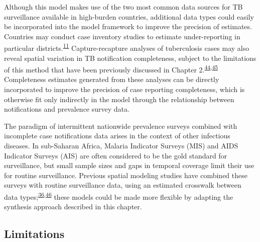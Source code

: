 \documentclass[
]{article}
\begin{document}
Although this model makes use of the two most common data sources for TB surveillance available in high-burden countries, additional data types could easily be incorporated into the model framework to improve the precision of estimates. Countries may conduct case inventory studies to estimate under-reporting in particular districts.\textsuperscript{\protect\hyperlink{ref-Glaziou2018a}{11}} Capture-recapture analyses of tuberculosis cases may also reveal spatial variation in TB notification completeness, subject to the limitations of this method that have been previously discussed in Chapter 2.\textsuperscript{\protect\hyperlink{ref-Hook1995}{44},\protect\hyperlink{ref-VanHest2011}{45}} Completeness estimates generated from these analyses can be directly incorporated to improve the precision of case reporting completeness, which is otherwise fit only indirectly in the model through the relationship between notifications and prevalence survey data.

The paradigm of intermittent nationwide prevalence surveys combined with incomplete case notifications data arises in the context of other infectious diseases. In sub-Saharan Africa, Malaria Indicator Surveys (MIS) and AIDS Indicator Surveys (AIS) are often considered to be the gold standard for surveillance, but small sample sizes and gaps in temporal coverage limit their use for routine surveillance. Previous spatial modeling studies have combined these surveys with routine surveillance data, using an estimated crosswalk between data types;\textsuperscript{\protect\hyperlink{ref-Dwyer-Lindgren2019}{36},\protect\hyperlink{ref-Lucas2019}{46}} these models could be made more flexible by adapting the synthesis approach described in this chapter.

\hypertarget{limitations}{%
\subsection{Limitations}\label{limitations}}
\end{document}

